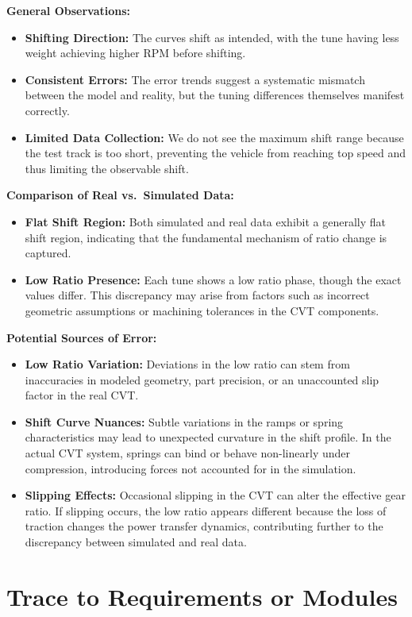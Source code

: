 \documentclass[12pt, titlepage]{article}
\begin{document}
\textbf{General Observations:}
\begin{itemize}
    \item \textbf{Shifting Direction:} The curves shift as intended, with the tune having less weight achieving higher RPM before shifting.
    \item \textbf{Consistent Errors:} The error trends suggest a systematic mismatch between the model and reality, but the tuning differences themselves manifest correctly.
    \item \textbf{Limited Data Collection:} We do not see the maximum shift range because the test track is too short, preventing the vehicle from reaching top speed and thus limiting the observable shift.
\end{itemize}

\textbf{Comparison of Real vs.\ Simulated Data:}
\begin{itemize}
    \item \textbf{Flat Shift Region:} Both simulated and real data exhibit a generally flat shift region, indicating that the fundamental mechanism of ratio change is captured.
    \item \textbf{Low Ratio Presence:} Each tune shows a low ratio phase, though the exact values differ. This discrepancy may arise from factors such as incorrect geometric assumptions or machining tolerances in the CVT components.
\end{itemize}

\textbf{Potential Sources of Error:}
\begin{itemize}
    \item \textbf{Low Ratio Variation:} Deviations in the low ratio can stem from inaccuracies in modeled geometry, part precision, or an unaccounted slip factor in the real CVT.
    \item \textbf{Shift Curve Nuances:} Subtle variations in the ramps or spring characteristics may lead to unexpected curvature in the shift profile. In the actual CVT system, springs can bind or behave non-linearly under compression, introducing forces not accounted for in the simulation.
    \item \textbf{Slipping Effects:} Occasional slipping in the CVT can alter the effective gear ratio. If slipping occurs, the low ratio appears different because the loss of traction changes the power transfer dynamics, contributing further to the discrepancy between simulated and real data.
\end{itemize}




\section{Trace to Requirements or Modules}
\end{document}
